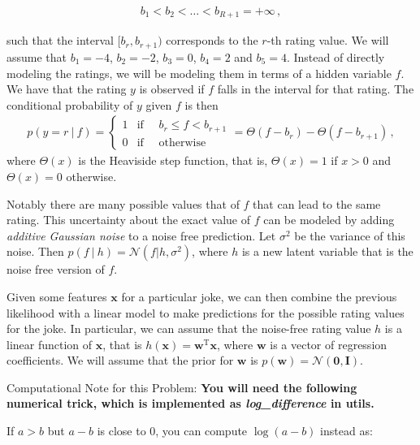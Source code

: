 \documentclass[10pt]{harvardml}
\theoremstyle{plain}
\begin{document}
\begin{align}
b_1 < b_2 < \ldots < b_{R+1} = +\infty\,,
\end{align}

\noindent such that the interval $[b_r,b_{r+1})$ corresponds to the $r$-th rating value.
We will assume that $b_1 = -4$, $b_2 = -2$, $b_3 = 0$, $b_4 = 2$ and $b_5 = 4$.
Instead of directly modeling the ratings, we will be modeling them in terms of a
hidden variable $f$. We have that the rating $y$ is observed
if $f$ falls in the interval for that rating. The conditional probability of
$y$ given $f$ is then
\begin{align}
p(y = r\ |\ f) =
\left\{
    \begin{array}{ll}
        1  & \mbox{if }\quad  b_r \leq f < b_{r+1} \\
        0 & \mbox{if } \quad \mbox{otherwise}
    \end{array}
\right.
= \Theta(f - b_r) - \Theta(f-b_{r+1})\,,
\end{align}
where $\Theta(x)$ is the Heaviside step function, that is, $\Theta(x)=1$ if
$x>0$ and $\Theta(x)=0$ otherwise.


Notably there are many possible values that of $f$ that can lead to
the same rating.  This uncertainty about the exact value of $f$ can be
modeled by adding \textit{additive Gaussian noise} to a noise free
prediction. Let $\sigma^2$ be the variance of this noise. Then
$p(f\ |\ h) = \mathcal{N}(f|h,\sigma^2)$, where $h$ is a new latent
variable that is the noise free version of $f$.

Given some features $\mathbf{x}$ for a particular joke, we can then combine the
previous likelihood with a linear model to make predictions for the possible
rating values for the joke. In particular, we can assume that the noise-free
rating value $h$ is a linear function of $\mathbf{x}$, that is
$h(\mathbf{x})=\mathbf{w}^\text{T} \mathbf{x}$, where $\mathbf{w}$ is a vector
of regression coefficients. We will assume that the prior for $\mathbf{w}$ is
$p(\mathbf{w})=\mathcal{N}(\bm 0, \mathbf{I})$.





\vspace{0.5cm }
\noindent
Computational Note for this Problem: \textbf{You will need the following numerical trick,
which is implemented as \textit{log\_difference} in utils.}

If $a > b $ but $a-b$ is close to 0, you can compute $\log(a-b)$
instead as:
\end{document}
